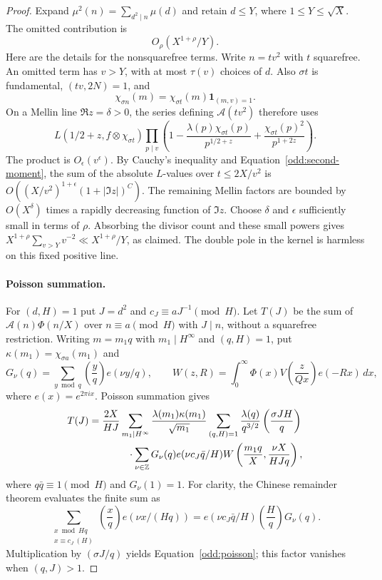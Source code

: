 \begin{proof}
Expand $\mu^2(n)=\sum_{d^2\mid n}\mu(d)$ and retain $d\le Y$, where
$1\le Y\le\sqrt X$.  The omitted contribution is
\begin{equation}\label{odd:square-tail}
 O_\rho(X^{1+\rho}/Y).
\end{equation}
Here are the details for the nonsquarefree terms.  Write $n=tv^2$ with
$t$ squarefree.  An omitted term has $v>Y$, with at most $\tau(v)$ choices
of $d$.  Also $\sigma t$ is fundamental, $(tv,2N)=1$, and
\[
 \chi_{\sigma n}(m)
   =\chi_{\sigma t}(m)\mathbf1_{(m,v)=1}.
\]
On a Mellin line $\Re z=\delta>0$, the series defining $\mathcal A(tv^2)$
therefore uses
\[
 L(1/2+z,f\otimes\chi_{\sigma t})
 \prod_{p\mid v}
 \left(1-\frac{\lambda(p)\chi_{\sigma t}(p)}{p^{1/2+z}}
             +\frac{\chi_{\sigma t}(p)^2}{p^{1+2z}}\right).
\]
The product is $O_\epsilon(v^\epsilon)$.  By Cauchy's inequality and
Equation~\eqref{odd:second-moment}, the sum of the absolute $L$-values
over $t\le2X/v^2$ is
$O((X/v^2)^{1+\epsilon}(1+|\Im z|)^C)$.
The remaining Mellin factors are bounded by $O(X^\delta)$ times a
rapidly decreasing function of $\Im z$.  Choose $\delta$ and $\epsilon$
sufficiently small in terms of $\rho$.  Absorbing the divisor count and
these small powers gives
$X^{1+\rho}\sum_{v>Y}v^{-2}\ll X^{1+\rho}/Y$, as claimed.
The double pole in the kernel is harmless on this fixed positive line.

\paragraph{Poisson summation.}
For $(d,H)=1$ put $J=d^2$ and $c_J\equiv aJ^{-1}\pmod H$.
Let $T(J)$ be the sum of $\mathcal A(n)\Phi(n/X)$ over
$n\equiv a\pmod H$ with $J\mid n$, without a squarefree restriction.
Writing $m=m_1q$ with $m_1\mid H^\infty$ and $(q,H)=1$, put
$\kappa(m_1)=\chi_{\sigma a}(m_1)$ and
\[
 G_\nu(q)=\sum_{y\bmod q}\left(\frac yq\right)e(\nu y/q),\qquad
 W(z,R)=\int_0^\infty\Phi(x)V\left(\frac z{Qx}\right)e(-Rx)\,dx,
\]
where $e(x)=e^{2\pi ix}$. Poisson summation gives
\begin{equation}\label{odd:poisson}
 \begin{split}
 T(J)={}&\frac{2X}{HJ}
 \sum_{m_1\mid H^\infty}\frac{\lambda(m_1)\kappa(m_1)}{\sqrt{m_1}}
 \sum_{(q,H)=1}\frac{\lambda(q)}{q^{3/2}}
                  \left(\frac{\sigma JH}{q}\right)\\
 &\hspace{9mm}\cdot\sum_{\nu\in\mathbb Z}
 G_\nu(q)e(\nu c_J\bar q/H)
 W\left(\frac{m_1q}{X},\frac{\nu X}{HJq}\right),
 \end{split}
\end{equation}
where $q\bar q\equiv1\pmod H$ and $G_\nu(1)=1$.
For clarity, the Chinese remainder theorem evaluates the finite sum as
\[
 \sum_{\substack{x\bmod Hq\\x\equiv c_J\ (H)}}
 \left(\frac xq\right)e(\nu x/(Hq))
 =e(\nu c_J\bar q/H)\left(\frac Hq\right)G_\nu(q).
\]
Multiplication by $(\sigma J/q)$ yields Equation~\eqref{odd:poisson};
this factor vanishes when $(q,J)>1$.


\end{proof}
